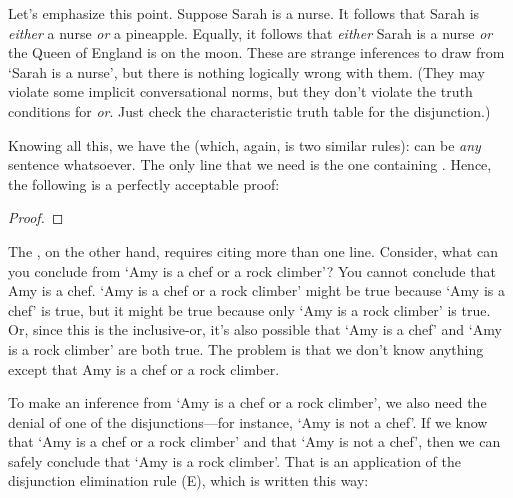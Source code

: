 Let's emphasize this point. Suppose Sarah is a nurse. It follows that Sarah is \emph{either} a nurse \emph{or} a pineapple. Equally, it follows that \emph{either} Sarah is a nurse \emph{or} the Queen of England is on the moon. These are strange inferences to draw from `Sarah is a nurse', but there is nothing logically wrong with them. (They may violate some implicit conversational norms, but they don't violate the truth conditions for \textit{or}. Just check the characteristic truth table for the disjunction.)

Knowing all this, we have the  (which, again, is two similar rules):
\factoidbox{\begin{proof}
	\have[m]{a}{\meta{A}}
	\have[\ ]{ab}{\meta{A}\eor\meta{B}}\oi{a}
\end{proof}
\begin{proof}
	\have[m]{a}{\meta{A}}
	\have[\ ]{ba}{\meta{B}\eor\meta{A}}\oi{a}
\end{proof}}
 can be \emph{any} sentence whatsoever. The only line that we need is the one containing . Hence, the following is a perfectly acceptable proof:
\begin{proof}
	 
\end{proof}

The , on the other hand, requires citing more than one line. Consider, what can you conclude from `Amy is a chef or a rock climber'? You cannot conclude that Amy is a chef. `Amy is a chef or a rock climber' might be true because `Amy is a chef' is true, but it might be true because only `Amy is a rock climber' is true. Or, since this is the inclusive-or, it's also possible that `Amy is a chef' and `Amy is a rock climber' are both true. The problem is that we don't know anything except that Amy is a chef or a rock climber. 

To make an inference from `Amy is a chef or a rock climber', we also need the denial of one of the disjunctions---for instance, `Amy is not a chef'. If we know that `Amy is a chef or a rock climber' and that `Amy is not a chef', then we can safely conclude that `Amy is a rock climber'. That is an application of the disjunction elimination rule ({\eor}E), which is written this way:

\factoidbox{
\begin{proof}
	\have[m]{ab}{\meta{A}\eor\meta{B}}
	\have[n]{nb}{\enot\meta{B}}
	\have[\ ]{a}{\meta{A}} \oe{ab,nb}
\end{proof}
\begin{proof}
	\have[m]{ab}{\meta{A}\eor\meta{B}}
	\have[n]{na}{\enot\meta{A}}
	\have[\ ]{b}{\meta{B}} \oe{ab,nb}
\end{proof}
}

